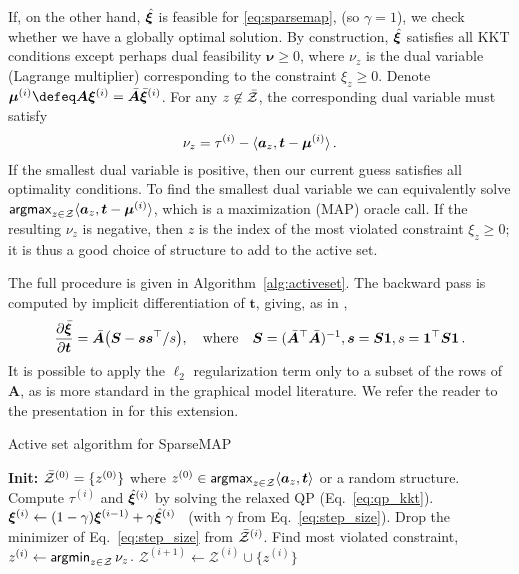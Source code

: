 If, on the other hand, $\hat{\bm{\xi}}$ is feasible for \eqref{eq:sparsemap},
(so $\gamma=1$),
we check whether we have a globally optimal solution.
By construction, $\hat{\bm{\xi}}$ satisfies all KKT
conditions except perhaps dual feasibility $\bm{\nu} \geq 0$,
where $\nu_z$ is the dual variable (Lagrange multiplier) corresponding to the
constraint $\xi_z \geq 0$.
Denote $\bm{\mu}^{(i)} \defeq \bm{A}\pv^{(i)} = \bar{\bm{A}}\bar{\pv}^{(i)}$.
For any $z \not\in \bar{\mathcal{Z}}$, the corresponding dual variable must satisfy
%
\begin{equation}\label{eq:dual}
    \nu_z = \tau^{(i)} - \langle\bm{a}_z,\bm{t} - \bm{\mu}^{(i)}\rangle\,.
\end{equation}
%
If the smallest dual variable is positive, then our current guess satisfies all
optimality conditions. To find the smallest dual variable we can equivalently
solve $\operatorname*{\mathsf{argmax}}_{z \in \mathcal{Z}} \langle\bm{a}_z,\bm{t} - \bm{\mu}^{(i)}\rangle$, which is
a maximization (MAP) oracle call. If the resulting $\nu_z$ is negative,
then $z$ is the index of the most violated constraint $\xi_z \geq 0$;
it is thus a good choice of structure to add to the active set.

The full procedure is given in Algorithm~\ref{alg:activeset}.
The backward pass is computed by implicit differentiation of  \wrt
$\bm{t}$, giving, as in \cite{niculae2018sparsemap},
\begin{equation}
    \frac{\partial \bar{\bm{\xi}}}{\partial \bm{t}} = \bar{\bm{A}}\big(\bm{S} - \bm{ss}^\top / s\big),
    \quad\text{where}\quad
    \bm{S} = (\bar{\bm{A}}^\top \bar{\bm{A}})^{-1},
    \bm{s} = \bm{S1}, s = \bm{1}^\top\bm{S1}
    \,.
\end{equation}
It is possible to apply the $\ell_2$ regularization term only to a subset of the
rows of $\bm{A}$, as is more standard in the graphical model literature. We
refer the reader to the presentation in \cite{ad3,niculae2018sparsemap} for this extension.

\begin{algorithm}[htpb]
    \caption{Active set algorithm for SparseMAP \label{alg:activeset}}
    \begin{algorithmic}[1]
        \Statex \textbf{Init:}
        $\bar{\mathcal{Z}}^{(0)} = \{ z^{(0)}\}$
        \quad where \quad
        $z^{(0)} \in \operatorname*{\mathsf{argmax}}_{z \in \mathcal{Z}} \langle\bm{a}_z,\bm{t}\rangle$
        or a random structure.
        \State Compute $\tau^{(i)}$ and $\hat{\bm{\xi}}^{(i)}$ by solving the relaxed QP (Eq.~\ref{eq:qp_kkt}).
        \State $\bm{\xi}^{(i)} \gets (1-\gamma) \bm{\xi}^{(i-1)} + \gamma \hat{\bm{\xi}}^{(i)}$
        ~(with $\gamma$ from Eq.~\ref{eq:step_size}).
        \State Drop the minimizer of Eq.~\ref{eq:step_size} from $\bar{\mathcal{Z}}^{(i)}$.
        \Else
        \State Find most violated constraint,
        $z^{(i)} \gets \operatorname*{\mathsf{argmin}}_{z \in \mathcal{Z}} \nu_z$.
        \State \Return {}
        \Else
        \State $\mathcal{Z}^{(i+1)} \gets \mathcal{Z}^{(i)} \cup \{ z^{(i)} \}$
        \EndIf
        \EndIf
        \EndFor
    \end{algorithmic}
\end{algorithm}